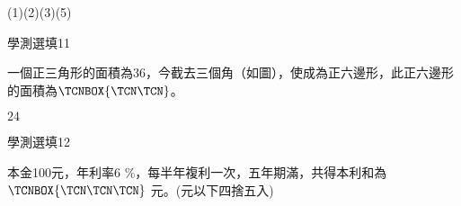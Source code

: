 \begin{QUESTIONS}
\begin{QUESTION}
        \begin{QANS}
            (1)(2)(3)(5)
        \end{QANS}
        \begin{QSOLLIST}
        \end{QSOLLIST}
        \begin{QEMPTYSPACE}
        \end{QEMPTYSPACE}
    \end{QUESTION}
\end{QUESTIONS}\begin{QUESTIONS}
    \begin{QUESTION}
        \begin{ExamInfo}{88}{學測}{選填}{11}
        \end{ExamInfo}
        \begin{ExamAnsRateInfo}{}{}{}{}
        \end{ExamAnsRateInfo}
        \begin{QBODY}
            一個正三角形的面積為$36$，今截去三個角（如圖），使成為正六邊形，此正六邊形的面積為$\TCNBOX{\TCN\TCN}$。
        \end{QBODY}
        \begin{QFROMS}
        \end{QFROMS}
        \begin{QTAGS}\end{QTAGS}
        \begin{QANS}
            $24$
        \end{QANS}
        \begin{QSOLLIST}
        \end{QSOLLIST}
        \begin{QEMPTYSPACE}
        \end{QEMPTYSPACE}
    \end{QUESTION}
    \begin{QUESTION}
        \begin{ExamInfo}{88}{學測}{選填}{12}
        \end{ExamInfo}
        \begin{ExamAnsRateInfo}{}{}{}{}
        \end{ExamAnsRateInfo}
        \begin{QBODY}
            本金100元，年利率6 \%，每半年複利一次，五年期滿，共得本利和為 $\TCNBOX{\TCN\TCN\TCN }$ 元。(元以下四捨五入)
        \end{QBODY}
        \begin{QFROMS}
        \end{QFROMS}

\end{QUESTION}
\end{QUESTIONS}
